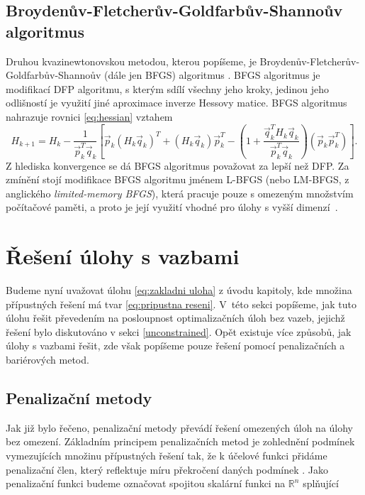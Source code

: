 \subsection{Broydenův-Fletcherův-Goldfarbův-Shannoův algoritmus}\label{BFGS}
Druhou kvazinewtonovskou metodou, kterou popíšeme, je Broydenův-Fletcherův-Goldfarbův-Shannoův (dále jen BFGS) algoritmus \cite{broyden1970}. BFGS algoritmus je modifikací DFP algoritmu, s kterým sdílí všechny jeho kroky, jedinou jeho odlišností je využití jiné aproximace inverze Hessovy matice. BFGS algoritmus nahrazuje rovnici \eqref{eq:hessian} vztahem
\begin{equation}
	H_{k+1} = H_k - \frac{1}{\vec{p}^{T}_{k} \vec{q}^{}_k} \left[ \vec{p}^{}_{k} (H_k \vec{q}^{}_k)^T + (H_k \vec{q}^{}_k) \vec{p}^T_k - \left( 1 + \frac{\vec{q}^T_k H_k \vec{q}^{}_k}{\vec{p}^T_k \vec{q}^{}_k} \right) (\vec{p}^{}_k \vec{p}^{T}_k) \right].
\end{equation}
Z hlediska konvergence se dá BFGS algoritmus považovat za lepší než DFP. Za zmínění stojí modifikace BFGS algoritmu jménem L-BFGS (nebo LM-BFGS, z anglického \textit{limited-memory BFGS}), která pracuje pouze s omezeným množstvím počítačové paměti, a proto je její využití vhodné pro úlohy s vyšší dimenzí~\cite{Byrd1995}.

\section{Řešení úlohy s vazbami}\label{constrained}
Budeme nyní uvažovat úlohu \ref{eq:zakladni uloha} z úvodu kapitoly, kde množina přípustných řešení má tvar \ref{eq:pripustna reseni}. V~této sekci popíšeme, jak tuto úlohu řešit převedením na posloupnost optimalizačních úloh bez vazeb, jejichž řešení bylo diskutováno v sekci \ref{unconstrained}. Opět existuje více způsobů, jak úlohy s vazbami řešit, zde však popíšeme pouze řešení pomocí penalizačních a bariérových metod.

\subsection{Penalizační metody}\label{penalty method}
Jak již bylo řečeno, penalizační metody převádí řešení omezených úloh na úlohy bez omezení. Základním principem penalizačních metod je zohlednění podmínek vymezujících množinu přípustných řešení tak, že k účelové funkci přidáme penalizační člen, který reflektuje míru překročení daných podmínek \cite{Bert}. Jako penalizační funkci budeme označovat spojitou skalární funkci na $ \mathbb{R}^n $ splňující


